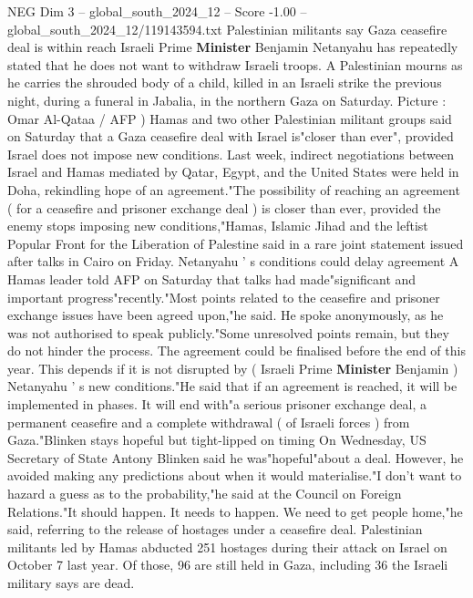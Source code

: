 \begin{textsample}{NEG Dim 3 – global\_south\_2024\_12 – Score -1.00 – global\_south\_2024\_12/119143594.txt}  \label{ex:f3_neg_067}
Palestinian militants say Gaza ceasefire deal is within reach Israeli Prime \textbf{Minister} Benjamin Netanyahu has repeatedly stated that he does not want to withdraw Israeli troops.
A Palestinian mourns as he carries the shrouded body of a child, killed in an Israeli strike the previous night, during a funeral in Jabalia, in the northern Gaza on Saturday.
Picture : Omar Al-Qataa / AFP ) Hamas and two other Palestinian militant groups said on Saturday that a Gaza ceasefire deal with Israel is"closer than ever", provided Israel does not impose new conditions.
Last week, indirect negotiations between Israel and Hamas mediated by Qatar, Egypt, and the United States were held in Doha, rekindling hope of an agreement."The possibility of reaching an agreement ( for a ceasefire and prisoner exchange deal ) is closer than ever, provided the enemy stops imposing new conditions,"Hamas, Islamic Jihad and the leftist Popular Front for the Liberation of Palestine said in a rare joint statement issued after talks in Cairo on Friday.
Netanyahu ' s conditions could delay agreement A Hamas leader told AFP on Saturday that talks had made"significant and important progress"recently."Most points related to the ceasefire and prisoner exchange issues have been agreed upon,"he said.
He spoke anonymously, as he was not authorised to speak publicly."Some unresolved points remain, but they do not hinder the process.
The agreement could be finalised before the end of this year.
This depends if it is not disrupted by ( Israeli Prime \textbf{Minister} Benjamin ) Netanyahu ' s new conditions."He said that if an agreement is reached, it will be implemented in phases.
It will end with"a serious prisoner exchange deal, a permanent ceasefire and a complete withdrawal ( of Israeli forces ) from Gaza."Blinken stays hopeful but tight-lipped on timing On Wednesday, US Secretary of State Antony Blinken said he was"hopeful"about a deal.
However, he avoided making any predictions about when it would materialise."I don't want to hazard a guess as to the probability,"he said at the Council on Foreign Relations."It should happen.
It needs to happen.
We need to get people home,"he said, referring to the release of hostages under a ceasefire deal.
Palestinian militants led by Hamas abducted 251 hostages during their attack on Israel on October 7 last year.
Of those, 96 are still held in Gaza, including 36 the Israeli military says are dead.

\end{textsample}
